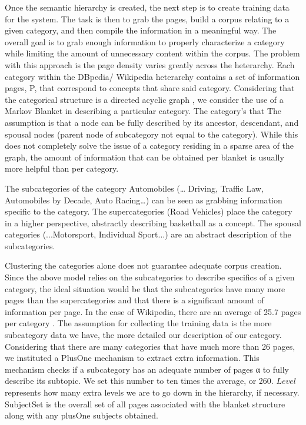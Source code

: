 Once the semantic hierarchy is created, the next step is to create
training data for the system. The task is then to grab the pages,
build a corpus relating to a given category, and then compile the
information in a meaningful way. The overall goal is to grab enough
information to properly characterize a category while limiting the
amount of unnecessary content within the corpus. The problem with this
approach is the page density varies greatly across the
heterarchy. Each category within the DBpedia/ Wikipedia heterarchy
contains a set of information pages, P, that correspond to concepts
that share said category. Considering that the categorical structure
is a directed acyclic graph \cite{Suchanek07yago:a}, we consider the
use of a Markov Blanket \cite{Friedman97bayesiannetwork} in describing
a particular category. The category's that The assumption is that a
node can be fully described by its ancestor, descendant, and spousal
nodes (parent node of subcategory not equal to the category). While
this does not completely solve the issue of a category residing in a
sparse area of the graph, the amount of information that can be
obtained per blanket is usually more helpful than per category.


The subcategories of the category Automobiles (… Driving, Traffic Law,
Automobiles by Decade, Auto Racing…) can be seen as grabbing
information specific to the category. The supercategories (Road
Vehicles) place the category in a higher perspective, abstractly
describing basketball as a concept. The spousal categories
(...Motorsport, Individual Sport...) are an abstract description of
the subcategories.


Clustering the categories alone does not guarantee adequate corpus
creation. Since the above model relies on the subcategories to
describe specifics of a given category, the ideal situation would be
that the subcategories have many more pages than the supercategories
and that there is a significant amount of information per page.  In
the case of Wikipedia, there are an average of 25.7 pages per category
\cite{1321474}. The assumption for collecting the training data is the
more subcategory data we have, the more detailed our description of
our category. Considering that there are many categories that have
much more than 26 pages, we instituted a PlusOne mechanism to extract
extra information. This mechanism checks if a subcategory has an
adequate number of pages α to fully describe its subtopic. We set this
number to ten times the average, or 260. $Level$ represents how many
extra levels we are to go down in the hierarchy, if
necessary. SubjectSet is the overall set of all pages associated with
the blanket structure along with any plusOne subjects obtained.

